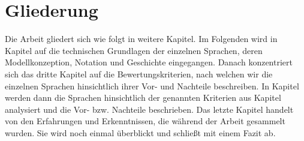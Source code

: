 \section{Gliederung}
\label{sc:Gliederung}
Die Arbeit gliedert sich wie folgt in weitere Kapitel. Im Folgenden wird in Kapitel \pageref{ch:Grundlagen} auf die technischen Grundlagen der einzelnen Sprachen, deren Modellkonzeption, Notation und Geschichte eingegangen. Danach konzentriert sich das dritte Kapitel auf die Bewertungskriterien, nach welchen wir die einzelnen Sprachen hinsichtlich ihrer Vor- und Nachteile beschreiben. In Kapitel \pageref{ch:BewertungModellierungssprachen} werden dann die Sprachen hinsichtlich der genannten Kriterien aus Kapitel \pageref{ch:Bewertungskriterien} analysiert und die Vor- bzw. Nachteile beschrieben.
Das letzte Kapitel \pageref{ch} handelt von den Erfahrungen und Erkenntnissen, die während
der Arbeit gesammelt wurden. Sie wird noch einmal überblickt und schließt mit einem Fazit ab.
